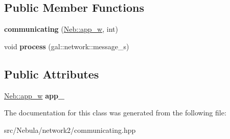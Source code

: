 \subsection*{\-Public \-Member \-Functions}
\begin{DoxyCompactItemize}
\item 
\hypertarget{classNeb_1_1network_1_1communicating_a3121daaafd61fc137cb5504b71717078}{{\bfseries communicating} (\hyperlink{classNeb_1_1weak__ptr}{\-Neb\-::app\-\_\-w}, int)}\label{classNeb_1_1network_1_1communicating_a3121daaafd61fc137cb5504b71717078}

\item 
\hypertarget{classNeb_1_1network_1_1communicating_a5643a6ec1ad7fd386b1eb3eea97a9862}{void {\bfseries process} (gal\-::network\-::message\-\_\-s)}\label{classNeb_1_1network_1_1communicating_a5643a6ec1ad7fd386b1eb3eea97a9862}

\end{DoxyCompactItemize}
\subsection*{\-Public \-Attributes}
\begin{DoxyCompactItemize}
\item 
\hypertarget{classNeb_1_1network_1_1communicating_a15215f50a4b77da570fb92926f72a835}{\hyperlink{classNeb_1_1weak__ptr}{\-Neb\-::app\-\_\-w} {\bfseries app\-\_\-}}\label{classNeb_1_1network_1_1communicating_a15215f50a4b77da570fb92926f72a835}

\end{DoxyCompactItemize}


\-The documentation for this class was generated from the following file\-:\begin{DoxyCompactItemize}
\item 
src/\-Nebula/network2/communicating.\-hpp\end{DoxyCompactItemize}
